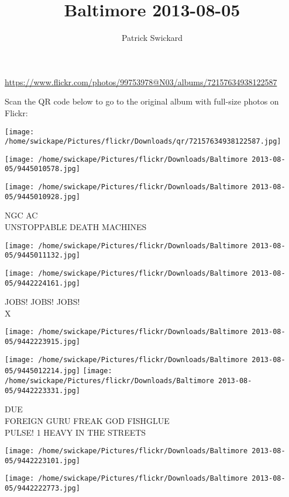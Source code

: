 \documentclass[10pt,letterpaper]{article}
\title{Baltimore 2013-08-05}
\author{Patrick Swickard}
\date{}
\begin{document}
\maketitle

\url{https://www.flickr.com/photos/99753978@N03/albums/72157634938122587}

Scan the QR code below to go to the original album with full-size photos on Flickr:

\texttt{[image: /home/swickape/Pictures/flickr/Downloads/qr/72157634938122587.jpg]}
\pagebreak

\texttt{[image: /home/swickape/Pictures/flickr/Downloads/Baltimore 2013-08-05/9445010578.jpg]}

\vspace{0.25in}
\texttt{[image: /home/swickape/Pictures/flickr/Downloads/Baltimore 2013-08-05/9445010928.jpg]}

NGC AC\\
UNSTOPPABLE DEATH MACHINES
\pagebreak

\texttt{[image: /home/swickape/Pictures/flickr/Downloads/Baltimore 2013-08-05/9445011132.jpg]}

\vspace{0.25in}
\texttt{[image: /home/swickape/Pictures/flickr/Downloads/Baltimore 2013-08-05/9442224161.jpg]}

JOBS! JOBS! JOBS!\\
X
\pagebreak

\texttt{[image: /home/swickape/Pictures/flickr/Downloads/Baltimore 2013-08-05/9442223915.jpg]}

\vspace{0.25in}
\texttt{[image: /home/swickape/Pictures/flickr/Downloads/Baltimore 2013-08-05/9445012214.jpg]}
\texttt{[image: /home/swickape/Pictures/flickr/Downloads/Baltimore 2013-08-05/9442223331.jpg]}

DUE\\
FOREIGN GURU FREAK GOD FISHGLUE\\
PULSE! 1 HEAVY IN THE STREETS
\pagebreak

\texttt{[image: /home/swickape/Pictures/flickr/Downloads/Baltimore 2013-08-05/9442223101.jpg]}

\vspace{0.25in}
\texttt{[image: /home/swickape/Pictures/flickr/Downloads/Baltimore 2013-08-05/9442222773.jpg]}
\end{document}
